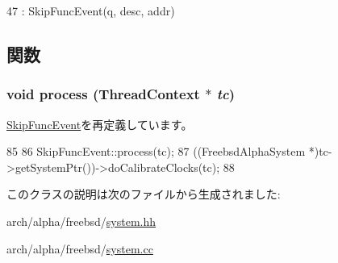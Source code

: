 \begin{DoxyCode}
47             : SkipFuncEvent(q, desc, addr) {}
\end{DoxyCode}


\subsection{関数}
\hypertarget{classFreebsdAlphaSystem_1_1SkipCalibrateClocksEvent_ad66a9d5ec7cfe597b848a17c0df5cc28}{
\subsubsection[{process}]{\setlength{\rightskip}{0pt plus 5cm}void process ({\bf ThreadContext} $\ast$ {\em tc})}}
\label{classFreebsdAlphaSystem_1_1SkipCalibrateClocksEvent_ad66a9d5ec7cfe597b848a17c0df5cc28}


\hyperlink{classSkipFuncEvent_ad66a9d5ec7cfe597b848a17c0df5cc28}{SkipFuncEvent}を再定義しています。


\begin{DoxyCode}
85 {
86     SkipFuncEvent::process(tc);
87     ((FreebsdAlphaSystem *)tc->getSystemPtr())->doCalibrateClocks(tc);
88 }
\end{DoxyCode}


このクラスの説明は次のファイルから生成されました:\begin{DoxyCompactItemize}
\item 
arch/alpha/freebsd/\hyperlink{arch_2alpha_2freebsd_2system_8hh}{system.hh}\item 
arch/alpha/freebsd/\hyperlink{arch_2alpha_2freebsd_2system_8cc}{system.cc}\end{DoxyCompactItemize}
